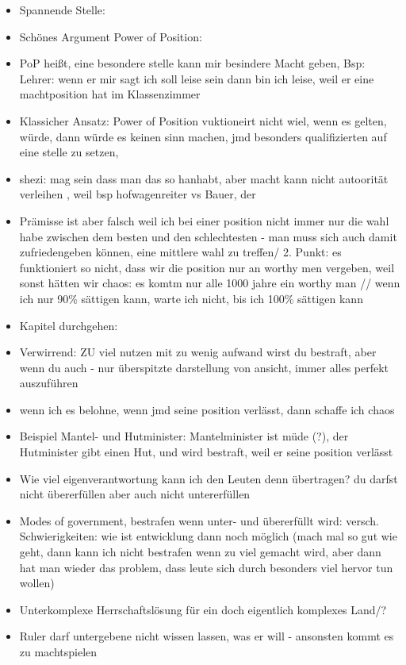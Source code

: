 \documentclass[emulatestandardclasses]{scrartcl}
\begin{document}
\begin{itemize}
  \item Spannende Stelle:
  \item Schönes Argument Power of Position:
  \item PoP heißt, eine besondere stelle kann mir besindere Macht geben, Bsp: Lehrer: wenn er mir sagt ich soll leise sein dann bin ich leise, weil er eine machtposition hat im Klassenzimmer
  \item Klassicher Ansatz: Power of Position vuktioneirt nicht wiel, wenn es gelten, würde, dann würde es keinen sinn machen, jmd besonders qualifizierten auf eine stelle zu setzen,  
  \item shezi: mag sein dass man das so hanhabt, aber macht kann nicht autoorität verleihen , weil bsp hofwagenreiter vs Bauer, der 
  \item Prämisse ist aber falsch weil ich bei einer position nicht immer nur die wahl habe zwischen dem besten und den schlechtesten - man muss sich auch damit zufriedengeben können, eine mittlere wahl zu treffen/ 2. Punkt: es funktioniert so nicht, dass wir die position nur an worthy men vergeben, weil sonst hätten wir chaos: es komtm nur alle 1000 jahre ein worthy man // wenn ich nur 90\% sättigen kann, warte ich nicht, bis ich 100\% sättigen kann
  \item Kapitel durchgehen: 
  \item Verwirrend: ZU viel nutzen mit zu wenig aufwand wirst du bestraft, aber wenn du auch - nur überspitzte darstellung von ansicht, immer alles perfekt auszuführen
  \item wenn ich es belohne, wenn jmd seine position verlässt, dann schaffe ich chaos
  \item Beispiel Mantel- und Hutminister: Mantelminister ist müde (?), der Hutminister gibt einen Hut, und wird bestraft, weil er seine position verlässt
  \item Wie viel eigenverantwortung kann ich den Leuten denn übertragen? du darfst nicht übererfüllen aber auch nicht untererfüllen
  \item Modes of government, bestrafen wenn unter- und übererfüllt wird: versch. Schwierigkeiten: wie ist entwicklung dann noch möglich (mach mal so gut wie geht, dann kann ich nicht bestrafen wenn zu viel gemacht wird, aber dann hat man wieder das problem, dass leute sich durch besonders viel hervor tun wollen)
  \item Unterkomplexe Herrschaftslösung für ein doch eigentlich komplexes Land/?
  \item Ruler darf untergebene nicht wissen lassen, was er will - ansonsten kommt es zu machtspielen

\end{itemize}
\end{document}
